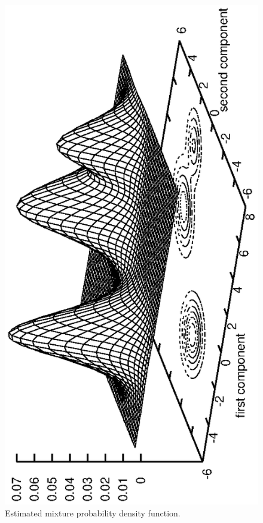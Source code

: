 \documentclass[12pt]{article}
\begin{document}
\begin{figure}
\centerline{\includegraphics[angle=-90]{ex1_mixture.ps}}
\caption{Estimated mixture probability density function.}
\label{fig:mix_pdf}
\end{figure}
\end{document}
